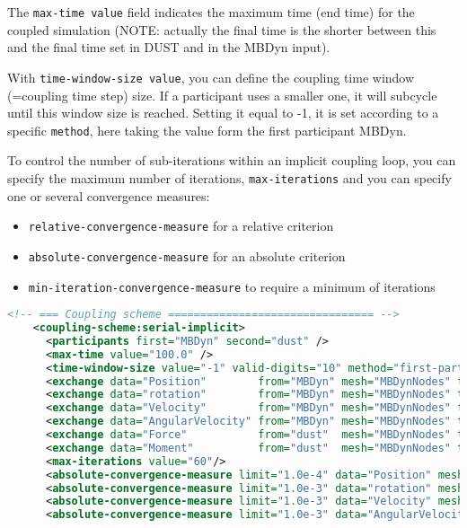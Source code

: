 The \texttt{max-time value} field indicates the maximum time (end time) 
for the coupled simulation  (NOTE: actually the final time is the shorter 
between this and the final time set in DUST and in the MBDyn input).

With \texttt{time-window-size value}, you can define the coupling time 
window (=coupling time step) size. If a participant uses a smaller one, 
it will subcycle until this window size is reached. 
Setting it equal to -1, it is set according to a specific \texttt{method}, 
here taking the value form the first participant MBDyn.

To control the number of sub-iterations within an implicit coupling loop, 
you can specify the maximum number of iterations, \texttt{max-iterations} 
and you can specify one or several convergence measures:
\begin{itemize}
    \item \texttt{relative-convergence-measure} for a relative criterion
    \item \texttt{absolute-convergence-measure} for an absolute criterion
    \item \texttt{min-iteration-convergence-measure} to require a minimum of iterations
\end{itemize}

\begin{lstlisting}[language=XML]
    <!-- === Coupling scheme ================================ -->
    <coupling-scheme:serial-implicit>
      <participants first="MBDyn" second="dust" />
      <max-time value="100.0" />
      <time-window-size value="-1" valid-digits="10" method="first-participant" />
      <exchange data="Position"        from="MBDyn" mesh="MBDynNodes" to="dust" />
      <exchange data="rotation"        from="MBDyn" mesh="MBDynNodes" to="dust" />
      <exchange data="Velocity"        from="MBDyn" mesh="MBDynNodes" to="dust" />
      <exchange data="AngularVelocity" from="MBDyn" mesh="MBDynNodes" to="dust" />
      <exchange data="Force"           from="dust"  mesh="MBDynNodes" to="MBDyn" />
      <exchange data="Moment"          from="dust"  mesh="MBDynNodes" to="MBDyn" />
      <max-iterations value="60"/>
      <absolute-convergence-measure limit="1.0e-4" data="Position" mesh="MBDynNodes" />
      <absolute-convergence-measure limit="1.0e-3" data="rotation" mesh="MBDynNodes" />
      <absolute-convergence-measure limit="1.0e-3" data="Velocity" mesh="MBDynNodes" />
      <absolute-convergence-measure limit="1.0e-3" data="AngularVelocity" mesh="MBDynNodes" /> 
\end{lstlisting}

